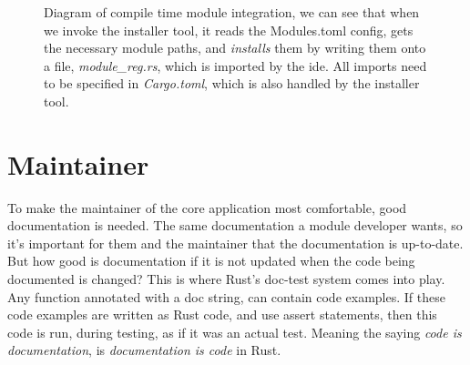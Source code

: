 \begin{figure}
  \centering
  
  \caption{
    Diagram of compile time module integration, we can see that when we invoke
    the installer tool, it reads the Modules.toml config, gets the necessary
    module paths, and \textit{installs} them by writing them onto a file,
    \textit{module\_reg.rs}, which is imported by the \gls{ide}. All imports
    need to be specified in \textit{Cargo.toml}, which is also handled by the
    installer tool.
  }
  \label{fig:compMod}
\end{figure}

\section{Maintainer}

To make the maintainer of the core application most comfortable, good
documentation is needed. The same documentation a module developer wants, so
it's important for them and the maintainer that the documentation is up-to-date.
But how good is documentation if it is not updated when the code being
documented is changed? This is where Rust's doc-test system comes into play. Any
function annotated with a doc string, can contain code examples. If these code
examples are written as Rust code, and use assert statements, then this code is
run, during testing, as if it was an actual test. Meaning the saying
\textit{code is documentation}, is \textit{documentation is code} in Rust.

